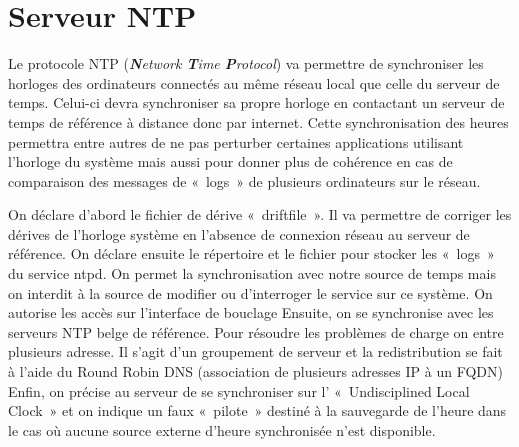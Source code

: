 \section{Serveur NTP}
Le protocole NTP (\textit{\textbf{N}etwork \textbf{T}ime \textbf{P}rotocol}) va permettre de synchroniser les horloges des ordinateurs connectés au même réseau local que celle du serveur de temps.
Celui-ci devra synchroniser sa propre horloge en contactant un serveur de temps de référence à distance donc  par internet.
Cette synchronisation des heures permettra entre autres de ne pas perturber certaines applications utilisant l’horloge du système mais aussi pour donner plus de cohérence en cas de comparaison des messages de « logs » de plusieurs ordinateurs sur le réseau.




On déclare d’abord le fichier de dérive « driftfile ». Il va permettre de corriger les dérives de l’horloge système en l’absence de connexion réseau au serveur de référence.
On déclare ensuite le répertoire et le fichier pour stocker les « logs » du service ntpd. 
On permet la synchronisation avec notre source de temps mais on interdit à la source de modifier ou d’interroger le service sur ce système.
On autorise les accès sur l’interface de bouclage
Ensuite, on se synchronise avec les serveurs NTP belge de référence. Pour résoudre les problèmes de charge on entre plusieurs adresse. Il s’agit d’un groupement de serveur et la redistribution se fait à l’aide du Round Robin DNS (association de plusieurs adresses IP à un FQDN)
Enfin, on précise au serveur de se synchroniser sur l’ « Undisciplined Local Clock » et on indique un faux « pilote » destiné à la sauvegarde de l’heure dans le cas où aucune source externe d’heure synchronisée n’est disponible.
